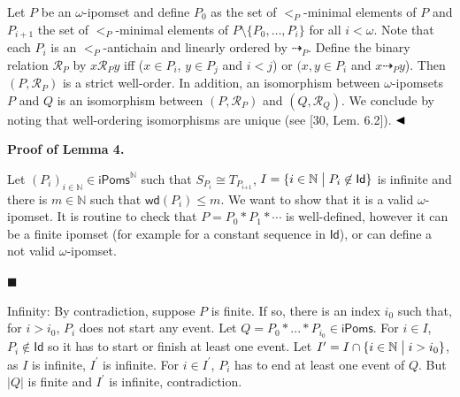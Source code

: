 \documentclass[10pt,a4paper]{article}
\begin{document}
Let $P$ be an $\omega$-ipomset and define $P_{0}$ as the set of $<_{P}$-minimal elements of $P$ and $P_{i+1}$ the set of $<_{P}$-minimal elements of $P\setminus\{P_{0},\dots,P_{i}\}$ for all $i<\omega$. Note that each $P_{i}$ is an $<_{P}$-antichain and linearly ordered by $\dashrightarrow_{P}$. Define the binary relation $\mathcal{R}_{P}$ by $x\mathcal{R}_{P}y$ iff ($x\in P_{i}$, $y\in P_{j}$ and $i<j$) or $(x,y\in P_{i}$ and $x\dashrightarrow_{P}y$). Then $(P,\mathcal{R}_{P})$ is a strict well-order. In addition, an isomorphism between $\omega$-ipomsets $P$ and $Q$ is an isomorphism between $(P,\mathcal{R}_{P})$ and $(Q,\mathcal{R}_{Q})$. We conclude by noting that well-ordering isomorphisms are unique (see [30, Lem. 6.2]). $\hfill\blacktriangleleft$\par
 
 
 
 
\par\medskip\noindent\textbf{Proof of Lemma 4.}\par
 
 
Let $(P_{i})_{i\in\mathbb{N}}\in\mathsf{iPoms}^{\mathbb{N}}$ such that $S_{P_{i}}\cong T_{P_{i\text{+}1}}$, $I={\{i\in\mathbb{N}\mathrel{\big{|}}P_{i}\not\in\mathsf{Id}\}}$ is infinite and there is $m\in\mathbb{N}$ such that $\mathsf{wd}(P_{i})\leqslant m$. We want to show that it is a valid $\omega$-ipomset. It is routine to check that $P=P_{0}*P_{1}*\cdots$ is well-defined, however it can be a finite ipomset (for example for a constant sequence in $\mathsf{Id}$), or can define a not valid $\omega$-ipomset.\par
  
\par\noindent  $\blacksquare$ 
 
Infinity: By contradiction, suppose $P$ is finite. If so, there is an index $i_{0}$ such that, for $i>i_{0}$, $P_{i}$ does not start any event. Let $Q=P_{0}*...*P_{i_{0}}\in\mathsf{iPoms}$. For $i\in I$, $P_{i}\not\in\mathsf{Id}$ so it has to start or finish at least one event. Let $I^{\prime}=I\cap{\{i\in\mathbb{N}\mathrel{\big{|}}i>i_{0}\}}$, as $I$ is infinite, $I^{\prime}$ is infinite. For $i\in I^{\prime}$, $P_{i}$ has to end at least one event of $Q$. But $|Q|$ is finite and $I^{\prime}$ is infinite, contradiction.\par
 
\end{document}
